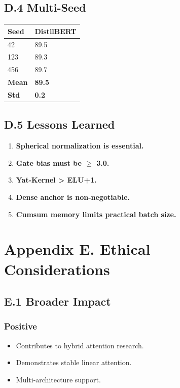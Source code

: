 \subsection{D.4 Multi-Seed}

\begin{table}[H]
\centering
\small
\begin{tabular}{ll}
\toprule
\textbf{Seed} & \textbf{DistilBERT} \\
\midrule
42 & 89.5 \\
123 & 89.3 \\
456 & 89.7 \\
\textbf{Mean} & \textbf{89.5} \\
\textbf{Std} & \textbf{0.2} \\
\bottomrule
\end{tabular}
\end{table}

\subsection{D.5 Lessons Learned}

\begin{enumerate}
\item \textbf{Spherical normalization is essential.}
\item \textbf{Gate bias must be $\ge$ 3.0.}
\item \textbf{Yat-Kernel > ELU+1.}
\item \textbf{Dense anchor is non-negotiable.}
\item \textbf{Cumsum memory limits practical batch size.}

\end{enumerate}


\section{Appendix E. Ethical Considerations}

\subsection{E.1 Broader Impact}

\subsubsection{Positive}
\begin{itemize}
\item Contributes to hybrid attention research.
\item Demonstrates stable linear attention.
\item Multi-architecture support.

\end{itemize}
